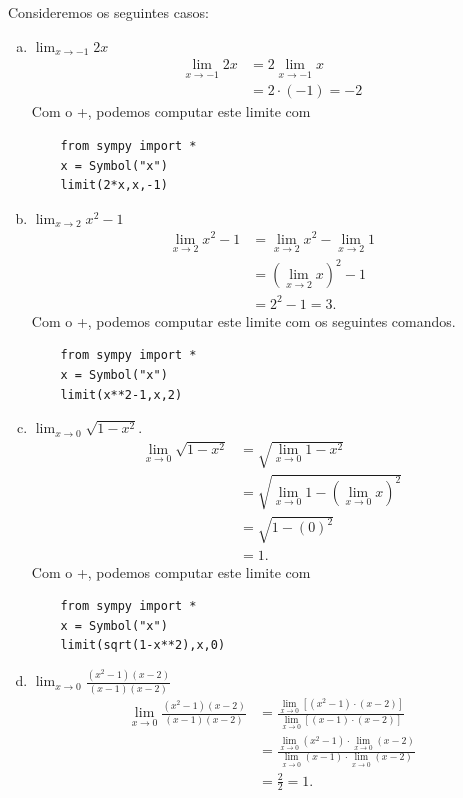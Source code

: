 \begin{ex}
  Consideremos os seguintes casos:
  \begin{enumerate}[a)]
  \item $\displaystyle \lim_{x\to -1} 2x$
  \begin{align}
    \lim_{x\to -1} 2x &= 2\lim_{x\to -1} x\\
    &= 2\cdot(-1) = -2
  \end{align}
  \ifispython
  Com o {\python}+{\sympy}, podemos computar este limite com
  \begin{lstlisting}
    from sympy import *
    x = Symbol("x")
    limit(2*x,x,-1)
  \end{lstlisting}
  \fi
\item $\displaystyle \lim_{x\to 2} x^2 - 1$
  \begin{align}
    \lim_{x\to 2} x^2 - 1 &= \lim_{x\to 2} x^2 - \lim_{x\to 2} 1\\
                          &= \left(\lim_{x\to 2} x\right)^2 - 1\\
                          &= 2^2 - 1 = 3.
  \end{align}
  \ifispython
  Com o {\python}+{\sympy}, podemos computar este limite com os seguintes comandos.
  \begin{lstlisting}
    from sympy import *
    x = Symbol("x")
    limit(x**2-1,x,2)
  \end{lstlisting}
  \fi
\item $\displaystyle \lim_{x\to 0} \sqrt{1-x^2}$.
  \begin{align}
    \lim_{x\to 0} \sqrt{1-x^2} &= \sqrt{\lim_{x\to 0} 1-x^2}\\
                                &= \sqrt{\lim_{x\to 0} 1 - \left(\lim_{x\to 0} x\right)^2}\\
                                &= \sqrt{1 - (0)^2} \\
                                &= 1.
  \end{align}
  \ifispython
  Com o {\python}+{\sympy}, podemos computar este limite com
  \begin{lstlisting}
    from sympy import *
    x = Symbol("x")
    limit(sqrt(1-x**2),x,0)
  \end{lstlisting}
  \fi  
\item $\displaystyle \lim_{x\to 0} \frac{(x^2-1)(x-2)}{(x-1)(x-2)}$
  \begin{align}
    \lim_{x\to 0} \frac{(x^2-1)(x-2)}{(x-1)(x-2)} &= \frac{\displaystyle\lim_{x\to 0}\left[(x^2-1)\cdot(x-2)\right]}{\displaystyle\lim_{x\to 0} \left[(x-1)\cdot(x-2)\right]}\\
                                                  &= \frac{\displaystyle\lim_{x\to 0} (x^2-1)\cdot\lim_{x\to 0}(x-2)}{\displaystyle\lim_{x\to 0}(x-1)\cdot\lim_{x\to 0}(x-2)}\\
    &= \frac{2}{2} = 1.
  \end{align}
  \end{enumerate}
\end{ex}

